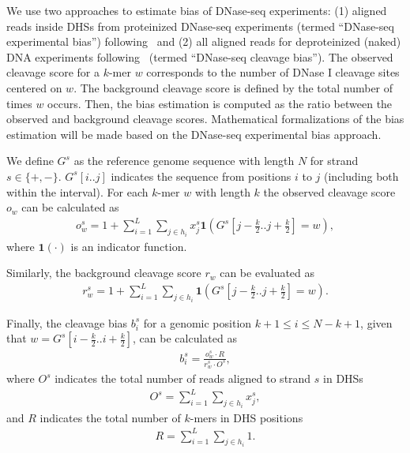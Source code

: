 \documentclass[11pt]{article}
\begin{document}
We use two approaches to estimate bias of DNase-seq experiments: (1) aligned reads inside DHSs from proteinized DNase-seq experiments (termed ``DNase-seq experimental bias'') following~\cite{he2014} and (2) all aligned reads for deproteinized (naked) DNA experiments following~\cite{yardimci2014} (termed ``DNase-seq cleavage bias''). The observed cleavage score for a $k$-mer $w$ corresponds to the number of DNase I cleavage sites centered on $w$. The background cleavage score is defined by the total number of times $w$ occurs. Then, the bias estimation is computed as the ratio between the observed and background cleavage scores. Mathematical formalizations of the bias estimation will be made based on the DNase-seq experimental bias approach.

We define $G^s$ as the reference genome sequence with length $N$ for strand $s \in \{+,-\}$. $G^s[i..j]$ indicates the sequence from positions $i$ to $j$ (including both within the interval). For each $k$-mer $w$ with length $k$ the observed cleavage score ${o}_{w}$ can be calculated as
\begin{align}
  o_w^s = 1 + \sum_{i=1}^L \sum_{j \in h_i} x^s_j \mathbf{1}\left( G^s[j-\frac{k}{2} .. j+\frac{k}{2}] = w\right),
  \label{eq:obscleav}
\end{align}
where ${\mathbf{1}}(\cdot)$ is an indicator function.

Similarly, the background cleavage score ${r}_{w}$ can be evaluated as
\begin{align}
  r_w^s = 1 + \sum_{i=1}^L \sum_{j \in h_i} \mathbf{1} \left( G^s[j-\frac{k}{2} .. j+\frac{k}{2}] = w\right).
  \label{eq:backcleav}
\end{align}

Finally, the cleavage bias ${b}_{i}^{s}$ for a genomic position $k+1 \leq i \leq N-k+1$, given that $w=G^s[i-\frac{k}{2}..i+\frac{k}{2}]$, can be calculated as
\begin{align}
  b_i^s = \frac{o^s_w \cdot R}{r^s_w \cdot O^s},
  \label{eq:cleavbias}
\end{align}
where $O^s$ indicates the total number of reads aligned to strand $s$ in DHSs
\begin{align}
O^s = \sum_{i=1}^L \sum_{j \in h_i} {x}^{s}_{j},
\label{eq:obscleav2}
\end{align}
and $R$ indicates the total number of $k$-mers in DHS positions
\begin{align}
R = \sum_{i=1}^{L}\sum_{j \in h_i} 1.
\label{eq:backcleav2}
\end{align}
\end{document}
